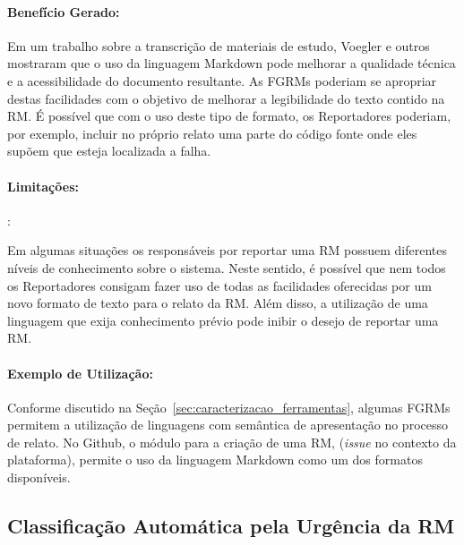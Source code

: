 \paragraph{Benefício Gerado:}\label{par:papéis_afetados_s06}

Em um trabalho sobre a transcrição de materiais de estudo, Voegler e
outros~\cite{voegler2014markdown} mostraram que o uso da linguagem Markdown
pode melhorar a qualidade técnica e a acessibilidade do documento resultante.
As FGRMs poderiam se apropriar destas facilidades com o objetivo de melhorar a
legibilidade do texto contido na RM\@. É possível que com o uso deste tipo de
formato, os Reportadores poderiam, por exemplo, incluir no próprio relato uma
parte do código fonte onde eles supõem que esteja localizada a falha.

\paragraph{Limitações:}:\label{par:limitacoes_s06}

Em algumas situações os responsáveis por reportar uma RM possuem diferentes
níveis de conhecimento sobre o sistema. Neste sentido, é possível que nem todos
os Reportadores consigam fazer uso de todas as facilidades oferecidas por um
novo formato de texto para o relato da RM\@. Além disso, a utilização de uma
linguagem que exija conhecimento prévio pode inibir o desejo de reportar uma
RM\@.

\paragraph{Exemplo de Utilização:}\label{par:exemplo_de_utilização_s06}

Conforme discutido na Seção~\ref{sec:caracterizacao_ferramentas}, algumas FGRMs
permitem a utilização de linguagens com semântica de apresentação no processo de
relato. No Github, o módulo para a criação de uma RM, (\textit{issue} no
contexto da plataforma), permite o uso da linguagem Markdown como um dos
formatos disponíveis.

\subsection{Classificação Automática pela Urgência da RM}\label{sub:priorizacao_automatica_rms}


